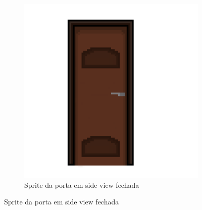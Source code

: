\begin{figure}[htbp]
\begin{subfigure}{0.45\linewidth}
    \end{subfigure}
    \begin{subfigure}{0.45\linewidth}
        \centering
        \includegraphics[width=1\linewidth]{figs/sprites/Porta front view.png}
        \caption{\small Sprite da porta em side view fechada}
        \label{fig:pixelLabPortaSideView}
    \end{subfigure}
\end{figure}



